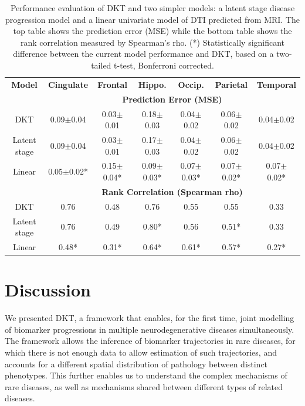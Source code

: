 \documentclass{llncs}
\begin{document}
\begin{table}
\footnotesize
\begin{tabular}{c | c c c c c c}
\textbf{Model} & \textbf{Cingulate} & \textbf{Frontal} & \textbf{Hippo.} & \textbf{Occip.} & \textbf{Parietal} & \textbf{Temporal}\\
& \multicolumn{6}{c}{\textbf{Prediction Error (MSE)}}\\
DKT & 0.09$\pm$0.04 & 0.03$\pm$0.01 & 0.18$\pm$0.03 & 0.04$\pm$0.02 & 0.06$\pm$0.02 & 0.04$\pm$0.02\\
Latent stage & 0.09$\pm$0.04 & 0.03$\pm$0.01 & 0.17$\pm$0.03 & 0.04$\pm$0.02 & 0.06$\pm$0.02 & 0.04$\pm$0.02\\
Linear & 0.05$\pm$0.02* & 0.15$\pm$0.04* & 0.09$\pm$0.03* & 0.07$\pm$0.03* & 0.07$\pm$0.02* & 0.07$\pm$0.02*\\
& \multicolumn{6}{c}{\textbf{Rank Correlation (Spearman rho)}}\\
DKT  & 0.76  & 0.48  & 0.76  & 0.55  & 0.55  & 0.33 \\
Latent stage & 0.76  & 0.49  & 0.80*  & 0.56  & 0.51*  & 0.33 \\
Linear & 0.48*  & 0.31*  & 0.64*  & 0.61*  & 0.57*  & 0.27* \\
\end{tabular}
\normalfont
\caption[Performance evaluation of DKT and two simpler models]{Performance evaluation of DKT and two simpler models: a latent stage disease progression model and a linear univariate model of DTI predicted from MRI. The top table shows the prediction error (MSE) while the bottom table shows the rank correlation measured by Spearman's rho. (*) Statistically significant difference between the current model performance and DKT, based on a two-tailed t-test, Bonferroni corrected.}
\label{sec:dktPerfMetrics}
\end{table}

\section{Discussion}
\label{sec:dktDis}

We presented DKT, a framework that enables, for the first time, joint modelling of biomarker progressions in multiple neurodegenerative diseases simultaneously. The framework allows the inference of biomarker trajectories in rare diseases, for which there is not enough data to allow estimation of such trajectories, and accounts for a different spatial distribution of pathology between distinct phenotypes. This further enables us to understand the complex mechanisms of rare diseases, as well as mechanisms shared between different types of related diseases.
\end{document}
